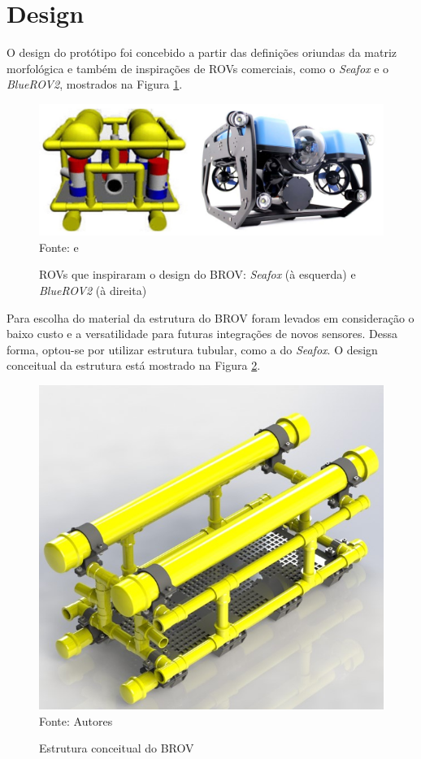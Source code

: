 \section{Design}
\label{sec:design}

O design do protótipo foi concebido a partir das definições oriundas da matriz morfológica e também de inspirações de ROVs comerciais, como o \textit{Seafox} e o \textit{BlueROV2}, mostrados na Figura \ref{fig:seafoxbluerov2}.

\begin{figure}[h]
	\centering
	\caption[ROVs que inspiraram o design do BROV]{ROVs que inspiraram o design do BROV: \textit{Seafox} (à esquerda) e \textit{BlueROV2} (à direita)}
	\label{fig:seafoxbluerov2}
	\includegraphics[width=0.8\linewidth]{images/seafox_bluerov2}\\
	\footnotesize Fonte: \cite{Rocha2014} e \cite{bluerov2}
	
\end{figure}

Para escolha do material da estrutura do BROV foram levados em consideração o baixo custo e a versatilidade para futuras integrações de novos sensores. Dessa forma, optou-se por utilizar estrutura tubular, como a do \textit{Seafox}. O design conceitual da estrutura está mostrado na Figura \ref{fig:brov-frame}.

\begin{figure}[h]
	\centering
	\caption{Estrutura conceitual do BROV}
	\label{fig:brov-frame}
	\includegraphics[width=0.7\linewidth]{images/brov-frame}\\
	\footnotesize Fonte: Autores
\end{figure}

